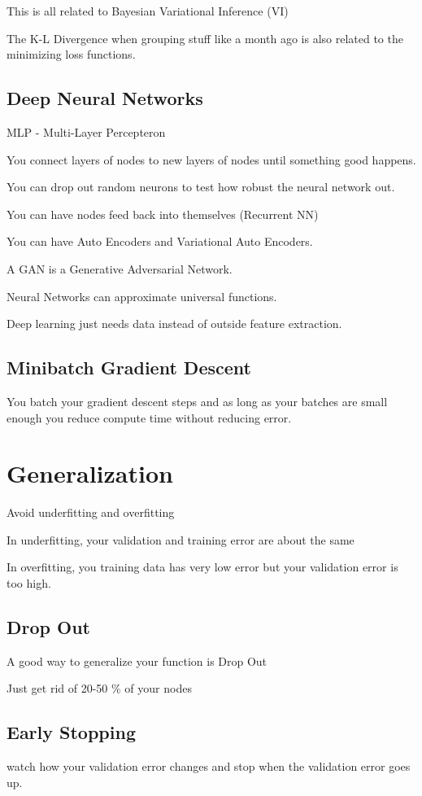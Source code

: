 \documentclass[fleqn]{report}
\begin{document}
This is all related to Bayesian Variational Inference (VI)

The K-L Divergence when grouping stuff like a month ago 
is also related to the minimizing loss functions. 

\subsection{Deep Neural Networks}
MLP - Multi-Layer Percepteron 

You connect layers of nodes to new layers of nodes until something 
good happens.

You can drop out random neurons to test how robust the neural network out. 

You can have nodes feed back into themselves (Recurrent NN)

You can have Auto Encoders and Variational Auto Encoders.

A GAN is a Generative Adversarial Network.

Neural Networks can approximate universal functions. 

Deep learning just needs data instead of outside feature extraction. 

\subsection{Minibatch Gradient Descent}
You batch your gradient descent steps and as long as your batches are 
small enough you reduce compute time without reducing error. 

\section{Generalization}
Avoid underfitting and overfitting 

In underfitting, your validation and training error are about the same 

In overfitting, you training data has very low error but your validation 
error is too high. 

\subsection{Drop Out}
A good way to generalize your function is Drop Out 

Just get rid of 20-50 \% of your nodes 

\subsection{Early Stopping}
watch how your validation error changes and stop when the validation 
error goes up. 
\end{document}

